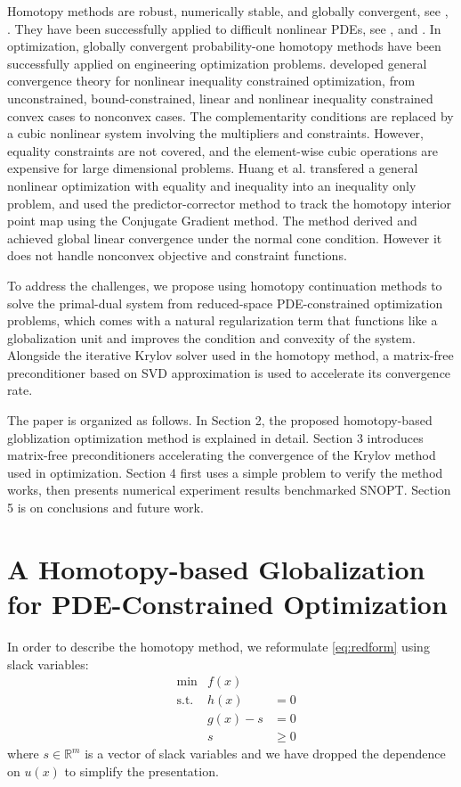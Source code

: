 \documentclass{article}
\theoremstyle{definition}
\begin{document}
Homotopy methods are robust, numerically stable, and globally convergent, see \cite{allgower_georg_1993}, \cite{Watson_1989}. They have been successfully applied to difficult nonlinear PDEs, see \cite{hicken:cfd2009, hicken:cfd2011b}, and \cite{Brown_2016}.  In optimization, globally convergent probability-one homotopy methods have been successfully applied on engineering optimization problems. \cite{Watson_2001} developed general convergence theory for nonlinear inequality constrained optimization, from unconstrained, bound-constrained, linear and nonlinear inequality constrained convex cases to nonconvex cases. The complementarity conditions are replaced by a cubic nonlinear system involving the multipliers and constraints. However, equality constraints are not covered, and the element-wise cubic operations are expensive for large dimensional problems. Huang et al. \cite{huang_2012pc} transfered a general nonlinear optimization with equality and inequality into an inequality only problem, and used the predictor-corrector method to track the homotopy interior point map using the Conjugate Gradient method. The method derived and achieved global linear convergence under the normal cone condition. However it does not handle nonconvex objective and constraint functions. 

To address the challenges, we propose using homotopy continuation methods to solve the primal-dual system from reduced-space PDE-constrained optimization problems, which comes with a natural regularization term that functions like a globalization unit and improves the condition and convexity of the system. Alongside the iterative Krylov solver used in the homotopy method, a matrix-free preconditioner based on SVD approximation is used to accelerate its convergence rate. 

The paper is organized as follows. In Section 2, the proposed homotopy-based globlization optimization method is explained in detail. Section 3 introduces matrix-free preconditioners accelerating the convergence of the Krylov method used in optimization. Section 4 first uses a simple problem to verify the method works, then presents numerical experiment results benchmarked SNOPT. Section 5 is on conclusions and future work.   

\section{A Homotopy-based Globalization for PDE-Constrained Optimization}
In order to describe the homotopy method, we reformulate \eqref{eq:redform} using slack variables:
\begin{equation}\label{eq:4}
\begin{aligned}
&\text{min}   &f(x) &\\
&\text{s.t.} &  h(x) &= 0 \\
& &  g(x) - s &= 0 \\
& &        s  &\geq 0 
\end{aligned}
\end{equation}
where $s \in \mathbb{R}^{m}$ is a vector of slack variables and we have dropped the dependence on $u(x)$ to simplify the presentation.
\end{document}
